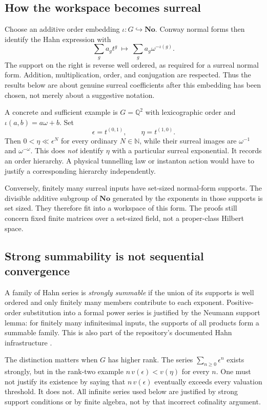 \documentclass[11pt,oneside]{article}
\numberwithin{equation}{section}
\theoremstyle{plain}
\theoremstyle{definition}
\theoremstyle{remark}
\newcommand{\Q}{\mathbb Q}
\newcommand{\N}{\mathbb N}
\newcommand{\No}{\mathbf{No}}
\begin{document}
\subsection{How the workspace becomes surreal}
Choose an additive order embedding $\iota:G\hookrightarrow\No$. Conway normal forms then identify the Hahn expression with
\begin{equation}\label{eq:embedding}
 \sum_g a_g t^g\ \longmapsto\ \sum_g a_g\omega^{-\iota(g)}.
\end{equation}
The support on the right is reverse well ordered, as required for a surreal normal form. Addition, multiplication, order, and conjugation are respected. Thus the results below are about genuine surreal coefficients after this embedding has been chosen, not merely about a suggestive notation.

A concrete and sufficient example is $G=\Q^2$ with lexicographic order and $\iota(a,b)=a\omega+b$. Set
\begin{equation}\label{eq:ranktwo}
 \epsilon=t^{(0,1)},\qquad \eta=t^{(1,0)}.
\end{equation}
Then $0<\eta\ll\epsilon^N$ for every ordinary $N\in\N$, while their surreal images are $\omega^{-1}$ and $\omega^{-\omega}$. This does \emph{not} identify $\eta$ with a particular surreal exponential. It records an order hierarchy. A physical tunnelling law or instanton action would have to justify a corresponding hierarchy independently.

Conversely, finitely many surreal inputs have set-sized normal-form supports. The divisible additive subgroup of $\No$ generated by the exponents in those supports is set sized. They therefore fit into a workspace of this form. The proofs still concern fixed finite matrices over a set-sized field, not a proper-class Hilbert space.

\subsection{Strong summability is not sequential convergence}
A family of Hahn series is \emph{strongly summable} if the union of its supports is well ordered and only finitely many members contribute to each exponent. Positive-order substitution into a formal power series is justified by the Neumann support lemma: for finitely many infinitesimal inputs, the supports of all products form a summable family. This is also part of the repository's documented Hahn infrastructure \cite{repo}.

The distinction matters when $G$ has higher rank. The series $\sum_{n\ge0}\epsilon^n$ exists strongly, but in the rank-two example $n\,v(\epsilon)<v(\eta)$ for every $n$. One must not justify its existence by saying that $n\,v(\epsilon)$ eventually exceeds every valuation threshold. It does not. All infinite series used below are justified by strong support conditions or by finite algebra, not by that incorrect cofinality argument.
\end{document}
